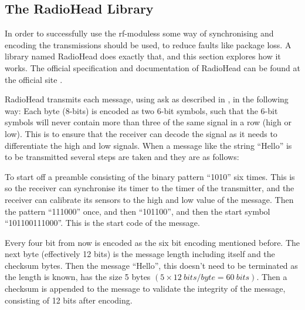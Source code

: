\subsection{The RadioHead Library}\label{subsubsec:RadioHead}

In order to successfully use the \gls{rf}-moduless some way of synchronising and encoding the transmissions should be used, to reduce faults like package loss.
A library named RadioHead does exactly that, and this section explores how it works.
The official specification and documentation of RadioHead can be found at the official site \cite{2015ArduinoRadioHead}.

RadioHead transmits each message, using \gls{ask} as described in , in the following way:
Each byte (8-bits) is encoded as two 6-bit symbols, such that the 6-bit symbols will never contain more than three of the same signal in a row (high or low).
This is to ensure that the receiver can decode the signal as it needs to differentiate the high and low signals.
When a message like the string \enquote{Hello} is to be transmitted several steps are taken and they are as follows:

To start off a preamble consisting of the binary pattern \enquote{1010} six times. 
This is so the receiver can synchronise its timer to the timer of the transmitter, and the receiver can calibrate its sensors to the high and low value of the message.
Then the pattern \enquote{111000} once, and then \enquote{101100}, and then the start symbol \enquote{101100111000}. 
This is the start code of the message. 

Every four bit from now is encoded as the six bit encoding mentioned before.
The next byte (effectively 12 bits) is the message length including itself and the checksum bytes.
Then the message \enquote{Hello}, this doesn't need to be terminated as the length is known, has the size 5 bytes $(5 \times 12\ bits/byte = 60\ bits)$.
Then a checksum is appended to the message to validate the integrity of the message, consisting of 12 bits after encoding.

